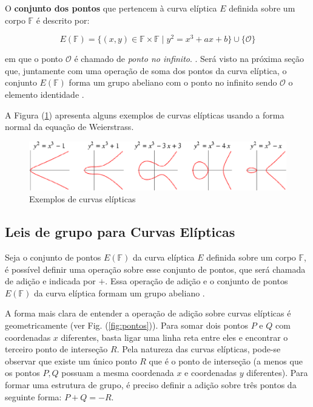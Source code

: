 O \textbf{conjunto dos pontos} que pertencem à curva elíptica \(E\) definida sobre um corpo \(\mathbb{F}\) é descrito por:

\begin{equation}
E(\mathbb{F}) = \{(x,y) \in \mathbb{F} \times \mathbb{F} \mid y^2 = x^3 + ax + b\} \cup \{\mathcal{O}\}
\label{eq:pontosCurva}
\end{equation}

em que o ponto $\mathcal{O}$ é chamado de \textit{ponto no infinito}. \cite{Mandy:2007}. Será visto na próxima seção que, juntamente com uma operação de soma dos pontos da curva elíptica, o conjunto $E(\mathbb{F})$ forma um grupo abeliano com o ponto no infinito sendo $\mathcal{O}$ o elemento identidade \cite{Guide}.

A Figura (\ref{fig:curvas}) apresenta alguns exemplos de curvas elípticas usando a forma normal da equação de Weierstrass.

\begin{figure}[h]
\centering
\includegraphics[scale=0.5, bb=0 0 529 101]{figuras/curvas.eps}
\caption{Exemplos de curvas elípticas}
\label{fig:curvas}
\end{figure}

%
%
\subsection{Leis de grupo para Curvas Elípticas}
Seja o conjunto de pontos $E(\mathbb{F})$ da curva elíptica \(E\) definida sobre um corpo \(\mathbb{F}\), é possível definir uma operação sobre esse conjunto de pontos, que será chamada de adição e indicada por $+$. Essa operação de adição e o conjunto de pontos $E(\mathbb{F})$ da curva elíptica formam um grupo abeliano \cite{Stallings:2011}.

A forma mais clara de entender a operação de adição sobre curvas elípticas é geometricamente (ver Fig. (\ref{fig:pontos})). Para somar dois pontos \(P\) e \(Q\) com coordenadas \(x\) diferentes, basta ligar uma linha reta entre eles e encontrar o terceiro ponto de interseção \(R\). Pela natureza das curvas elípticas, pode-se observar que existe um único ponto \(R\) que é o ponto de interseção (a menos que os pontos \(P, Q\) possuam a mesma coordenada $x$ e coordenadas $y$ diferentes). Para formar uma estrutura de grupo, é preciso  definir a adição sobre três pontos da seguinte forma: $P+Q=-R$. \cite{Stallings:2011}

